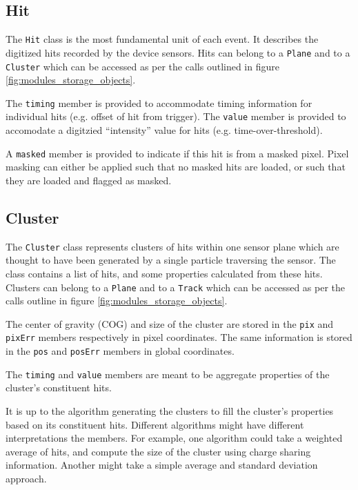 \documentclass[10pt,a4paper]{book}
\begin{document}
\subsection{Hit}

The \Verb`Hit` class is the most fundamental unit of each event. It describes the digitized hits recorded by the device sensors. Hits can belong to a \Verb`Plane` and to a \Verb`Cluster` which can be accessed as per the calls outlined in figure \ref{fig:modules_storage_objects}.

The \Verb`timing` member is provided to accommodate timing information for individual hits (e.g. offset of hit from trigger). The \Verb`value` member is provided to accomodate a digitzied ``intensity'' value for hits (e.g. time-over-threshold).

A \Verb`masked` member is provided to indicate if this hit is from a masked pixel. Pixel masking can either be applied such that no masked hits are loaded, or such that they are loaded and flagged as masked.

\subsection{Cluster}

The \Verb`Cluster` class represents clusters of hits within one sensor plane which are thought to have been generated by a single particle traversing the sensor. The class contains a list of hits, and some properties calculated from these hits. Clusters can belong to a \verb`Plane` and to a \verb`Track` which can be accessed as per the calls outline in figure \ref{fig:modules_storage_objects}.

The center of gravity (COG) and size of the cluster are stored in the \Verb`pix` and \Verb`pixErr` members respectively in pixel coordinates. The same information is stored in the \Verb`pos` and \Verb`posErr` members in global coordinates.

The \Verb`timing` and \Verb`value` members are meant to be aggregate properties of the cluster's constituent hits.

It is up to the algorithm generating the clusters to fill the cluster's properties based on its constituent hits. Different algorithms might have different interpretations the members. For example, one algorithm could take a weighted average of hits, and compute the size of the cluster using charge sharing information. Another might take a simple average and standard deviation approach.
\end{document}
